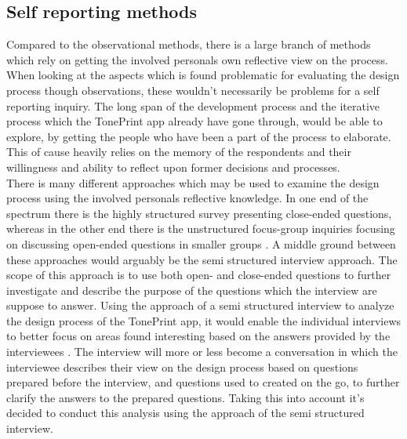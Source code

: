 \subsection*{Self reporting methods}
\label{MethodInterview}
Compared to the observational methods, there is a large branch of methods which rely on getting the involved personals own reflective view on the process. When looking at the aspects which is found problematic for evaluating the design process though observations, these wouldn't necessarily be problems for a self reporting inquiry. The long span of the development process and the iterative process which the TonePrint app already have gone through, would be able to explore, by getting the people who have been a part of the process to elaborate. This of cause heavily relies on the memory of the respondents and their willingness and ability to reflect upon former decisions and processes.\\
There is many different approaches which may be used to examine the design process using the involved personals reflective knowledge. In one end of the spectrum there is the highly structured survey presenting close-ended questions, whereas in the other end there is the unstructured focus-group inquiries focusing on discussing open-ended questions in smaller groups \textcite{WEB:ConductingSemiStructured}. A middle ground between these approaches would arguably be the semi structured interview approach. The scope of this approach is to use both open- and close-ended questions to further investigate and describe the purpose of the questions which the interview are suppose to answer. Using the approach of a semi structured interview to analyze the design process of the TonePrint app, it would enable the individual interviews to better focus on areas found interesting based on the answers provided by the interviewees . The interview will more or less become a conversation in which the interviewee describes their view on the design process based on questions prepared before the interview, and questions used to created on the go, to further clarify the answers to the prepared questions. Taking this into account it's decided to conduct this analysis using the approach of the semi structured interview.\\
\\

